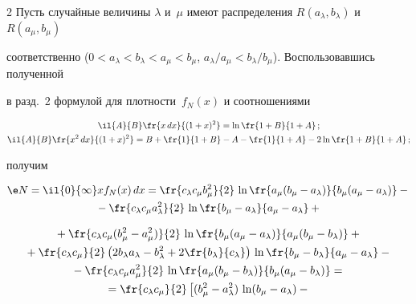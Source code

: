 \begin{multicols}{2}
Пусть случайные величины $\lambda$ и~$\mu$ имеют распределения $R(a_\lambda,b_\lambda)$ и $R(a_\mu,b_\mu)$


соответственно ($0<a_\lambda<b_\lambda<a_\mu<b_\mu$, $a_\lambda/a_\mu<b_\lambda/b_\mu$). Воспользовавшись полученной


в разд.~2 формулой для плотности~$f_N(x)$ и соотношениями


\begin{gather*}


\il{A}{B}\fr{x\,dx}{(1+x)^2}=\ln\fr{1+B}{1+A}\,;\\


\il{A}{B}\fr{x^2\,dx}{(1+x)^2}=B+\fr{1}{1+B}-A-\fr{1}{1+A}-2\ln\fr{1+B}{1+A}\,;


\end{gather*}


получим


\begin{multline*}


\e N=\il{0}{\infty}xf_N(x)\,dx=\fr{c_\lambda c_\mu b_\mu^2}{2}\,\ln\fr{a_\mu(b_\mu-


a_\lambda)}{b_\mu(a_\mu-a_\lambda)}-{}\\


{}-\fr{c_\lambda c_\mu a_\lambda^2}{2}\,\ln


\fr{b_\mu- a_\lambda}{a_\mu-a_\lambda}+{}


\end{multline*}


\begin{multline*}


{}+\fr{c_\lambda c_\mu (b_\mu^2-a_\mu^2)}{2}\,\ln


\fr{b_\mu(a_\mu-a_\lambda)}{a_\mu(b_\mu-b_\lambda)}+{}\\




{}+\fr{c_\lambda c_\mu }{2}


\left(2b_\lambda a_\lambda-b_\lambda^2+2\fr{b_\lambda}{c_\lambda}\right)\,\ln


\fr{b_\mu-b_\lambda}{a_\mu-a_\lambda}-{}\\


{}-\fr{c_\lambda c_\mu a_\mu^2}{2}\,\ln


\fr{a_\mu(b_\mu-b_\lambda)}{b_\mu(a_\mu-b_\lambda)}={}\\


{}=\fr{c_\lambda c_\mu}{2}\left[(b_\mu^2-a_\lambda^2)\,\ln(b_\mu-a_\lambda)-{}\right.\\



\end{multline*}
\end{multicols}
